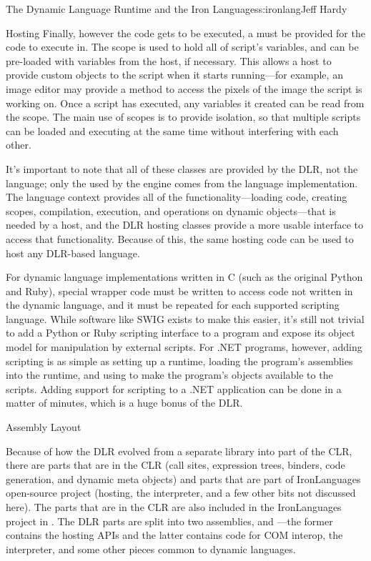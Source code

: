 \begin{aosachapter}{The Dynamic Language Runtime and the Iron Languages}{s:ironlang}{Jeff Hardy}
\begin{aosasect1}{Hosting}
Finally, however the code gets to be executed, a 
must be provided for the code to execute in. The scope is used to hold
all of script's variables, and can be pre-loaded with variables from
the host, if necessary. This allows a host to provide custom objects
to the script when it starts running---for example, an image editor
may provide a method to access the pixels of the image the script is
working on. Once a script has executed, any variables it created can
be read from the scope. The main use of scopes is to provide
isolation, so that multiple scripts can be loaded and executing at the
same time without interfering with each other.

It's important to note that all of these classes are provided by the
DLR, not the language; only the  used by the
engine comes from the language implementation. The language context
provides all of the functionality---loading code, creating scopes,
compilation, execution, and operations on dynamic objects---that is
needed by a host, and the DLR hosting classes provide a more usable
interface to access that functionality. Because of this, the same
hosting code can be used to host any DLR-based language.

For dynamic language implementations written in C (such as the
original Python and Ruby), special wrapper code must be written to
access code not written in the dynamic language, and it must be
repeated for each supported scripting language. While software like
SWIG exists to make this easier, it's still not trivial to add a
Python or Ruby scripting interface to a program and expose its object
model for manipulation by external scripts. For .NET programs,
however, adding scripting is as simple as setting up a runtime,
loading the program's assemblies into the runtime, and using
 to make the program's objects
available to the scripts. Adding support for scripting to a .NET
application can be done in a matter of minutes, which is a huge bonus
of the DLR.

\end{aosasect1}

\begin{aosasect1}{Assembly Layout}

Because of how the DLR evolved from a separate library into part of
the CLR, there are parts that are in the CLR (call sites, expression
trees, binders, code generation, and dynamic meta objects) and parts
that are part of IronLanguages open-source project (hosting, the
interpreter, and a few other bits not discussed here). The parts that
are in the CLR are also included in the IronLanguages project in
. The DLR parts are split into two
assemblies,  and
---the former contains the hosting APIs and
the latter contains code for COM interop, the interpreter, and some
other pieces common to dynamic languages.


\end{aosasect1}
\end{aosachapter}
